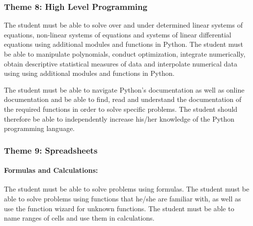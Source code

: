         \subsubsection{Theme 8: High Level Programming}
%                 
%                 
            
                The student must be able to solve over and under determined linear
                systems of equations, non-linear systems of equations and systems 
                of linear differential equations using additional modules and 
                functions in Python. The student must be able to manipulate 
                polynomials, conduct optimization, integrate numerically, obtain
                descriptive statistical measures of data and interpolate numerical 
                data using using additional modules and functions in Python.
                
                The student must be able to navigate Python's documentation 
                as well as online documentation and be able to find, read and 
                understand the documentation of the required functions in order 
                to solve specific problems. The student should therefore be able
                to independently increase his/her knowledge of the Python
                programming language.

        \subsubsection{Theme 9: Spreadsheets}
            \paragraph{Formulas and Calculations:}
                The student must be able to solve problems using formulas. The
                student must be able to solve problems using functions that he/she
                are familiar with, as well as use the function wizard for unknown
                functions. The student must be able to name ranges of cells and use
                them in calculations.

